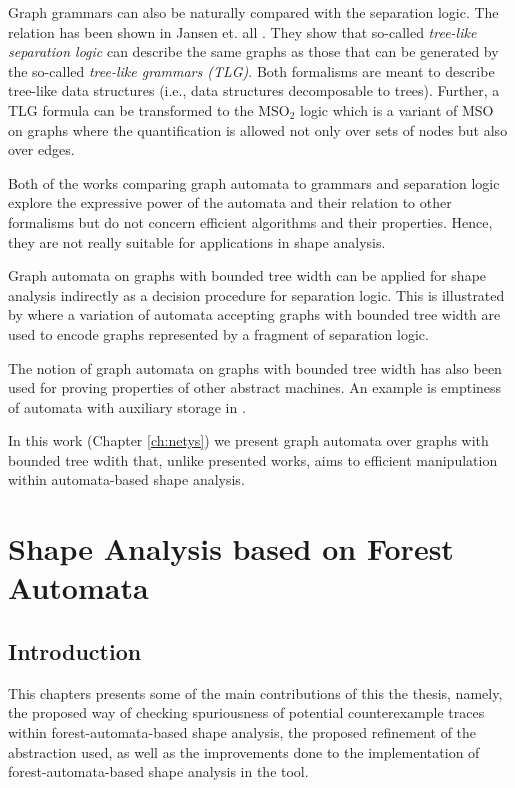 	Graph grammars can also be naturally compared with the separation logic.
	The relation has been shown in Jansen et. all \cite{matheja_treelike_2015}.
	They show that so-called \emph{tree-like separation logic} can describe the same graphs
	as those that can be generated by the so-called \emph{tree-like grammars (TLG)}.
	Both formalisms are meant to describe tree-like data structures (i.e., data structures
	decomposable to trees).
	Further, a TLG formula can be transformed to the $\mathrm{MSO_2}$ logic which is a variant of MSO
	on graphs where the quantification is allowed not only over sets of nodes but also
	over edges.

	Both of the works comparing graph automata to grammars and separation logic
	explore the expressive power of the automata and their relation to other formalisms
	but do not concern efficient algorithms and their properties.
	Hence, they are not really suitable for applications in shape analysis.

	Graph automata on graphs with bounded tree width can be applied for shape analysis
	indirectly as a decision procedure for separation logic.
	This is illustrated by \cite{iosif_treewidth_2013} where a variation of automata
	accepting graphs with bounded tree width are used to encode graphs represented
	by a fragment of separation logic.

	The notion of graph automata on graphs with bounded tree width has also been used
	for proving properties of other abstract machines.
	An example is emptiness of automata with auxiliary storage in \cite{soa-popl11tw}.

        In this work (Chapter \ref{ch:netys}) we present graph automata over graphs with bounded tree wdith that,
        unlike presented works, aims to efficient manipulation within automata-based shape analysis.

\chapter{Shape Analysis based on Forest Automata}
\label{ch:asv}
\section{Introduction}\label{sec:label}

This chapters presents some of the main contributions of this the thesis,
namely, the proposed way of checking spuriousness of potential counterexample
traces within forest-automata-based shape analysis, the proposed refinement of the abstraction
used, as well as the improvements done to the implementation of forest-automata-based shape analysis
in the \forester tool.

